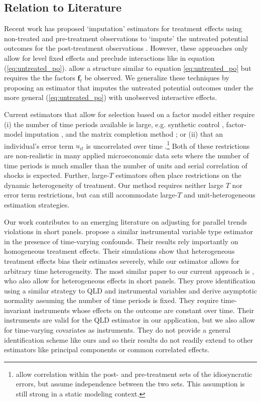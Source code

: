 \documentclass[12pt]{article}
\begin{document}
\subsection*{Relation to Literature}

Recent work has proposed `imputation' estimators for treatment effects using non-treated and pre-treatment observations to `impute' the untreated potential outcomes for the post-treatment observations \citep[e.g.][]{Borusyak_Jaravel_Spiess_2021,Gardner_2021,Wooldridge_2021}. However, these approaches only allow for level fixed effects and preclude interactions like in equation (\ref{eq:untreated_po}). \citet{Borusyak_Jaravel_Spiess_2021} allow a structure similar to equation \eqref{eq:untreated_po} but requires the the factors $\bm f_t$ be observed. We generalize these techniques by proposing an estimator that imputes the untreated potential outcomes under the more general (\ref{eq:untreated_po}) with unobserved interactive effects.

Current estimators that allow for selection based on a factor model either require (i) the number of time periods available is large, e.g. synthetic control \citep{abadie2021using}, factor-model imputation \citep{Xu_2017,Gobillon_Magnac_2016}, and the matrix completion method  \citep{Athey_et_al_2021}; or (ii) that an individual's error term $u_{it}$ is uncorrelated over time \citep{Imbens_Kallus_Mao_2021}.\footnote{\citet{Imbens_Kallus_Mao_2021} allow correlation within the post- and pre-treatment sets of the idiosyncratic errors, but assume independence between the two sets. This assumption is still strong in a static modeling context.} Both of these restrictions are non-realistic in many applied microeconomic data sets where the number of time periods is much smaller than the number of units and serial correlation of shocks is expected. Further, large-$T$ estimators often place restrictions on the dynamic heterogeneity of treatment. Our method requires neither large $T$ nor error term restrictions, but can still accommodate large-$T$ and unit-heterogeneous estimation strategies.

Our work contributes to an emerging literature on adjusting for parallel trends violations in short panels. \citet{freyaldenhoven2019pre} propose a similar instrumental variable type estimator in the presence of time-varying confounds. Their results rely importantly on homogeneous treatment effects. Their simulations show that heterogeneous treatment effects bias their estimates severely, while our estimator allows for arbitrary time heterogeneity. The most similar paper to our current approach is \citet{Callaway_Karami_2020}, who also allow for heterogeneous effects in short panels. They prove identification using a similar strategy to QLD and instrumental variables and derive asymptotic normality assuming the number of time periods is fixed. They require time-invariant instruments whose effects on the outcome are constant over time. Their instruments are valid for the QLD estimator in our application, but we also allow for time-varying covariates as instruments. They do not provide a general identification scheme like ours and so their results do not readily extend to other estimators like principal components or common correlated effects.
\end{document}
